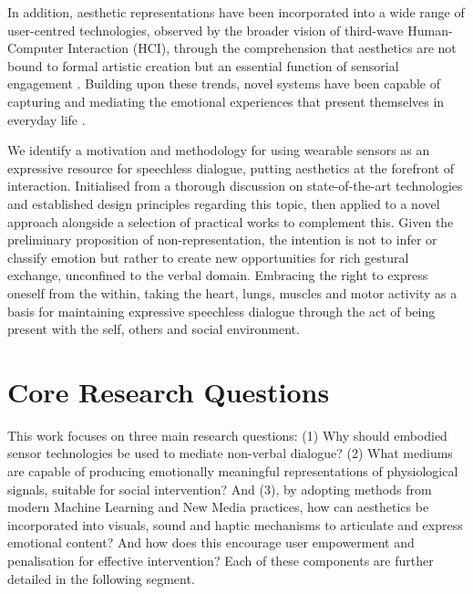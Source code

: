 In addition, aesthetic representations have been incorporated into a wide range of user-centred technologies, observed by the broader vision of third-wave Human-Computer Interaction (HCI), through the comprehension that aesthetics are not bound to formal artistic creation but an essential function of sensorial engagement \cite{bodker2015third}. Building upon these trends, novel systems have been capable of capturing and mediating the emotional experiences that present themselves in everyday life \cite{schiphorst_designing_2020}.

We identify a motivation and methodology for using wearable sensors as an expressive resource for speechless dialogue, putting aesthetics at the forefront of interaction. Initialised from a thorough discussion on state-of-the-art technologies and established design principles regarding this topic, then applied to a novel approach alongside a selection of practical works to complement this. Given the preliminary proposition of non-representation, the intention is not to infer or classify emotion but rather to create new opportunities for rich gestural exchange, unconfined to the verbal domain. Embracing the right to express oneself from the within, taking the heart, lungs, muscles and motor activity as a basis for maintaining expressive speechless dialogue through the act of being present with the self, others and social environment.

\section{Core Research Questions}
\label{sec:research_questions}

This work focuses on three main research questions: (1) Why should embodied sensor technologies be used to mediate non-verbal dialogue? (2) What mediums are capable of producing emotionally meaningful representations of physiological signals, suitable for social intervention? And (3), by adopting methods from modern Machine Learning and New Media practices, how can aesthetics be incorporated into visuals, sound and haptic mechanisms to articulate and express emotional content? And how does this encourage user empowerment and penalisation for effective intervention? Each of these components are further detailed in the following segment.

    
